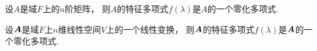 \begin{theorem}
设\(A\)是域\(F\)上的\(n\)阶矩阵，
则\(A\)的特征多项式\(f(\lambda)\)是\(A\)的一个零化多项式.
\end{theorem}

\begin{corollary}
设\(\boldsymbol{A}\)是域\(F\)上\(n\)维线性空间\(V\)上的一个线性变换，
则\(\boldsymbol{A}\)的特征多项式\(f(\lambda)\)是\(\boldsymbol{A}\)的一个零化多项式.
\end{corollary}
